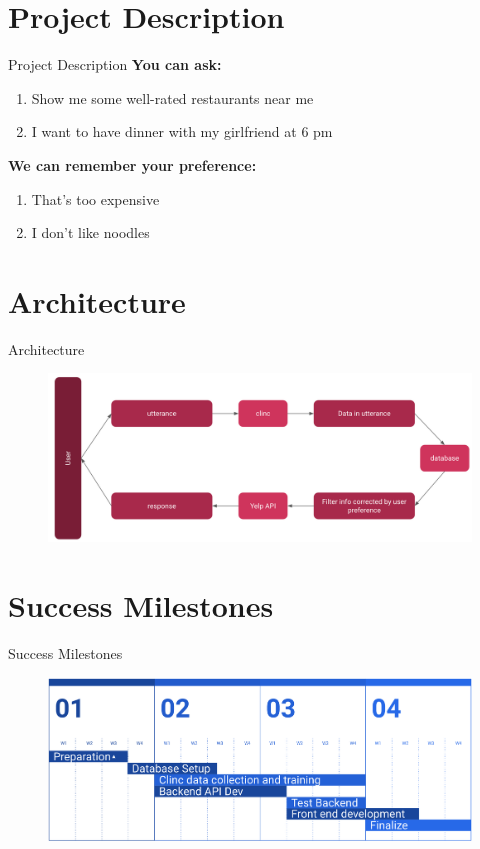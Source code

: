\documentclass[aspectratio=169]{beamer}
\begin{document}
\section{Project Description}
\begin{frame}{Project Description}
\textbf{You can ask:}
\begin{enumerate}
        \item Show me some well-rated restaurants near me
        \item I want to have dinner with my girlfriend at 6 pm
\end{enumerate}
\pause
\vspace{2em}
\textbf{We can remember your preference:}
\begin{enumerate}
    \item That’s too expensive
    \item I don’t like noodles

\end{enumerate}
\end{frame}


\section{Architecture}
\begin{frame}{Architecture}
\begin{figure}
        \includegraphics[width=13cm]{image3}
\end{figure}
\end{frame}

\section{Success Milestones}
\begin{frame}{Success Milestones}
\begin{figure}
        \includegraphics[width=13cm]{image4}
\end{figure}
\end{frame}
\end{document}
